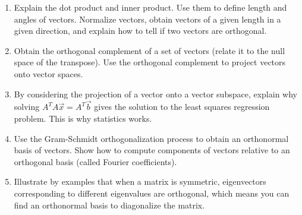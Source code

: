 
\begin{enumerate}

\item Explain the dot product and inner product. Use them to define length and angles of vectors. Normalize vectors, obtain vectors of a given length in a given direction, and explain how to tell if two vectors are orthogonal. 

\item Obtain the orthogonal complement of a set of vectors (relate it to the null space of the transpose). Use the orthogonal complement to project vectors onto vector spaces. 

\item By considering the projection of a vector onto a vector subspace, explain why solving $A^TA \vec x = A^T\vec b$ gives the solution to the least squares regression problem. This is why statistics works.

\item Use the Gram-Schmidt orthogonalization process to obtain an orthonormal basis of vectors. Show how to compute components of vectors relative to an orthogonal basis (called Fourier coefficients).  

\item Illustrate by examples that when a matrix is symmetric, eigenvectors corresponding to different eigenvalues are orthogonal, which means you can find an orthonormal basis to diagonalize the matrix. 

\end{enumerate}

